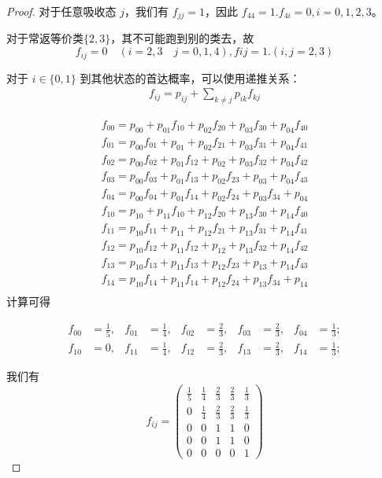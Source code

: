 \documentclass[lang=cn,10pt,thmcnt=section]{elegantbook}
\begin{document}
\begin{proof}
对于任意吸收态 $j$，我们有 $f_{jj} = 1$，因此 $f_{44} = 1.f_{4i}=0,i=0,1,2,3$。

对于常返等价类$\{2,3\}$，其不可能跑到别的类去，故
\[
	f_{ij}=0\quad(i=2,3\quad j=0,1,4),f{ij}=1.(i,j=2,3)
\]

对于 $i \in \{0, 1\}$ 到其他状态的首达概率，可以使用递推关系：
\begin{align}
f_{ij} = p_{ij} + \sum_{k \neq j} p_{ik}f_{kj}
\end{align}


\begin{equation*}
	\begin{split}
		f_{00}=p_{00}+p_{01}f_{10}+p_{02}f_{20}+p_{03}f_{30}+p_{04}f_{40}\\
		f_{01}=p_{00}f_{01}+p_{01}+p_{02}f_{21}+p_{03}f_{31}+p_{04}f_{41}\\
		f_{02}=p_{00}f_{02}+p_{01}f_{12}+p_{02}+p_{03}f_{32}+p_{04}f_{42}\\
		f_{03}=p_{00}f_{03}+p_{01}f_{13}+p_{02}f_{23}+p_{03}+p_{04}f_{43}\\
		f_{04}=p_{00}f_{04}+p_{01}f_{14}+p_{02}f_{24}+p_{03}f_{34}+p_{04}\\
		f_{10}=p_{10}+p_{11}f_{10}+p_{12}f_{20}+p_{13}f_{30}+p_{14}f_{40}\\
		f_{11}=p_{10}f_{11}+p_{11}+p_{12}f_{21}+p_{13}f_{31}+p_{14}f_{41}\\
		f_{12}=p_{10}f_{12}+p_{11}f_{12}+p_{12}+p_{13}f_{32}+p_{14}f_{42}\\
		f_{13}=p_{10}f_{13}+p_{11}f_{13}+p_{12}f_{23}+p_{13}+p_{14}f_{43}\\
		f_{14}=p_{10}f_{14}+p_{11}f_{14}+p_{12}f_{24}+p_{13}f_{34}+p_{14}\\
	\end{split}
\end{equation*}
计算可得

\begin{align*}
	f_{00} &= \frac{1}{5}, & f_{01} &= \frac{1}{4}, & f_{02} &= \frac{2}{3}, & f_{03} &= \frac{2}{3}, & f_{04} &= \frac{1}{3}; \\
	f_{10} &= 0, & f_{11} &= \frac{1}{4}, & f_{12} &= \frac{2}{3}, & f_{13} &= \frac{2}{3}, & f_{14} &= \frac{1}{3};
\end{align*}


我们有
\[
f_{ij} = \begin{pmatrix}
	\frac{1}{5} & \frac{1}{4} & \frac{2}{3} & \frac{2}{3} & \frac{1}{3} \\
0 & \frac{1}{4} & \frac{2}{3} & \frac{2}{3} & \frac{1}{3} \\
0 & 0 & 1 & 1& 0 \\
0 & 0 & 1& 1& 0 \\
0 & 0 & 0 & 0 & 1
\end{pmatrix}
\]


\end{proof}
\end{document}

